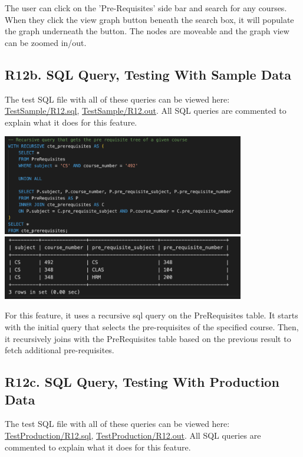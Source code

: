 \documentclass[12pt, a4paper]{article}
\begin{document}
The user can click on the 'Pre-Requisites' side bar and search for any courses. When they click the view graph button beneath the search box, it will populate the graph underneath the button. The nodes are moveable and the graph view can be zoomed in/out.

\subsection*{R12b. SQL Query, Testing With Sample Data}
The test SQL file with all of these queries can be viewed here: \underline{\href{https://github.com/Kggupta/DegreeMap/tree/main/Database/Queries/TestSample}{TestSample/R12.sql}}, \underline{\href{https://github.com/Kggupta/DegreeMap/tree/main/Database/Queries/TestSample}{TestSample/R12.out}}. All SQL queries are commented to explain what it does for this feature.
\begin{center}
    \includegraphics[width=400px]{R12/q1}
    \includegraphics[width=400px]{R12/q1out}
\end{center}
For this feature, it uses a recursive sql query on the PreRequisites table. It starts with the initial query that selects the pre-requisites of the specified course. Then, it recursively joins with the PreRequisites table based on the previous result to fetch additional pre-requisites.
\subsection*{R12c. SQL Query, Testing With Production Data}
The test SQL file with all of these queries can be viewed here: \underline{\href{https://github.com/Kggupta/DegreeMap/tree/main/Database/Queries/TestProduction}{TestProduction/R12.sql}}, \underline{\href{https://github.com/Kggupta/DegreeMap/tree/main/Database/Queries/TestProduction}{TestProduction/R12.out}}. All SQL queries are commented to explain what it does for this feature.
\end{document}
